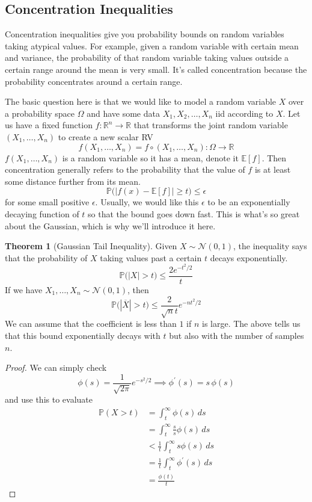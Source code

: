 \documentclass{article}
\theoremstyle{definition}
\newtheorem{theorem}{Theorem}[section]
\theoremstyle{remark}
\theoremstyle{definition}
\begin{document}
\subsection{Concentration Inequalities}

Concentration inequalities give you probability bounds on random variables taking atypical values. For example, given a random variable with certain mean and variance, the probability of that random variable taking values outside a certain range around the mean is very small. It's called concentration because the probability concentrates around a certain range. 

The basic question here is that we would like to model a random variable $X$ over a probability space $\Omega$ and have some data $X_1, X_2, \ldots, X_n$ iid according to $X$. Let us have a fixed function $f: \mathbb{R}^n \longrightarrow \mathbb{R}$ that transforms the joint random variable $(X_1, \ldots, X_n)$ to create a new scalar RV 
\[f(X_1, \ldots, X_n) = f \circ (X_1, \ldots, X_n) : \Omega \longrightarrow \mathbb{R}\]
$f(X_1, \ldots, X_n)$ is a random variable so it has a mean, denote it $\mathbb{E}[f]$. Then concentration generally refers to the probability that the value of $f$ is at least some distance further from its mean. 
\[\mathbb{P} \big( |f(x) - \mathbb{E}[f] | \geq t \big) \leq \epsilon\]
for some small positive $\epsilon$. Usually, we would like this $\epsilon$ to be an exponentially decaying function of $t$ so that the bound goes down fast. This is what's so great about the Gaussian, which is why we'll introduce it here. 

\begin{theorem}[Gaussian Tail Inequality]
Given $X \sim \mathcal{N}(0, 1)$, the inequality says that the probability of $X$ taking values past a certain $t$ decays exponentially. 
\[\mathbb{P} \big( |X| > t \big) \leq \frac{2 e^{-t^2/2}}{t}\]
If we have $X_1, \ldots, X_n \sim \mathcal{N}(0, 1)$, then 
\[\mathbb{P} \big( |\overline{X}| > t \big) \leq \frac{2}{\sqrt{n} t} e^{-n t^2/2}\]
We can assume that the coefficient is less than $1$ if $n$ is large. The above tells us that this bound exponentially decays with $t$ but also with the number of samples $n$. 
\end{theorem}
\begin{proof}
We can simply check 
\[\phi(s) = \frac{1}{\sqrt{2\pi}} e^{-s^2/2} \implies \phi^\prime (s) = s \, \phi(s)\]
and use this to evaluate
\begin{align*}
    \mathbb{P}(X > t ) & = \int_t^\infty \phi(s) \,ds \\
    & = \int_t^\infty \frac{s}{s} \phi(s) \,ds \\
    & < \frac{1}{t} \int_t^\infty s \phi(s)\,ds \\
    & = \frac{1}{t} \int_t^\infty \phi^\prime (s)\,ds \\
    & = \frac{\phi(t)}{t}
\end{align*}
\end{proof}
\end{document}
